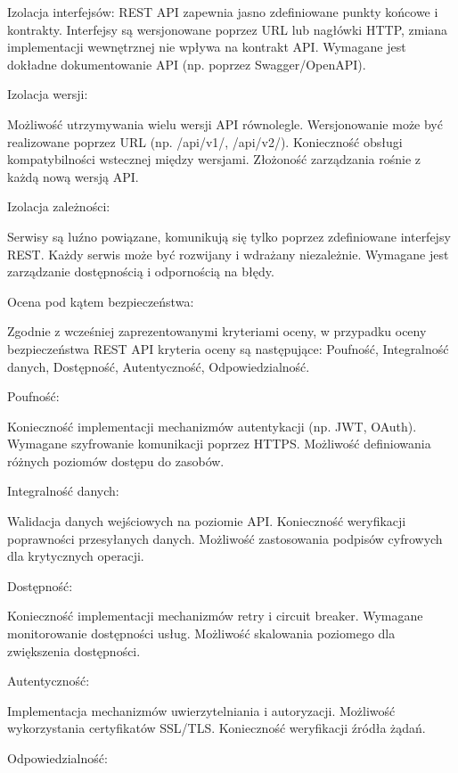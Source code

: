 \documentclass[runningheads,12pt]{llncs}
\begin{document}
Izolacja interfejsów: REST API zapewnia jasno zdefiniowane punkty końcowe i kontrakty. Interfejsy są wersjonowane poprzez URL lub nagłówki HTTP, zmiana implementacji wewnętrznej nie wpływa na kontrakt API. Wymagane jest dokładne dokumentowanie API (np. poprzez Swagger/OpenAPI). ~\cite[p. 124]{richardson2013rest}

Izolacja wersji: 

Możliwość utrzymywania wielu wersji API równolegle. Wersjonowanie może być realizowane poprzez URL (np. /api/v1/, /api/v2/). Konieczność obsługi kompatybilności wstecznej między wersjami. Złożoność zarządzania rośnie z każdą nową wersją API. ~\cite[p. 89]{richardson2013rest}\

Izolacja zależności: 

Serwisy są luźno powiązane, komunikują się tylko poprzez zdefiniowane interfejsy REST. Każdy serwis może być rozwijany i wdrażany niezależnie. Wymagane jest zarządzanie dostępnością i odpornością na błędy. ~\cite[p. 156]{newman2015building}

Ocena pod kątem bezpieczeństwa:

Zgodnie z wcześniej zaprezentowanymi kryteriami oceny, w przypadku oceny bezpieczeństwa REST API kryteria oceny są następujące: Poufność, Integralność danych, Dostępność, Autentyczność, Odpowiedzialność.

Poufność: 

Konieczność implementacji mechanizmów autentykacji (np. JWT, OAuth). Wymagane szyfrowanie komunikacji poprzez HTTPS. Możliwość definiowania różnych poziomów dostępu do zasobów. ~\cite[p. 245]{newman2015building}

Integralność danych: 

Walidacja danych wejściowych na poziomie API. Konieczność weryfikacji poprawności przesyłanych danych. Możliwość zastosowania podpisów cyfrowych dla krytycznych operacji. ~\cite[p. 267]{newman2015building}

Dostępność: 

Konieczność implementacji mechanizmów retry i circuit breaker. Wymagane monitorowanie dostępności usług. Możliwość skalowania poziomego dla zwiększenia dostępności. ~\cite[p. 178]{richardson2013rest}

Autentyczność: 

Implementacja mechanizmów uwierzytelniania i autoryzacji. Możliwość wykorzystania certyfikatów SSL/TLS. Konieczność weryfikacji źródła żądań. ~\cite[p. 289]{newman2015building}

Odpowiedzialność: 
\end{document}

